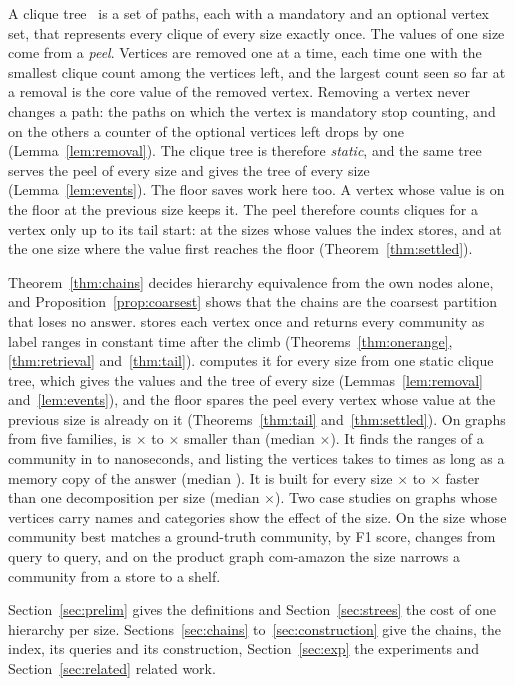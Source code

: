 %
A clique tree~\cite{Pivoter} is a set of paths, each with a mandatory and an optional vertex set, that represents every clique of every size exactly once.
%
The values of one size come from a \emph{peel}.
%
Vertices are removed one at a time, each time one with the smallest clique count among the vertices left, and the largest count seen so far at a removal is the core value of the removed vertex.
%
Removing a vertex never changes a path: the paths on which the vertex is mandatory stop counting, and on the others a counter of the optional vertices left drops by one (Lemma~\ref{lem:removal}).
%
The clique tree is therefore \emph{static}, and the same tree serves the peel of every size and gives the tree of every size (Lemma~\ref{lem:events}).
%
The floor saves work here too.
%
A vertex whose value is on the floor at the previous size keeps it.
%
The peel therefore counts cliques for a vertex only up to its tail start: at the sizes whose values the index stores, and at the one size where the value first reaches the floor (Theorem~\ref{thm:settled}).

Theorem~\ref{thm:chains} decides hierarchy equivalence from the own nodes alone, and Proposition~\ref{prop:coarsest} shows that the chains are the coarsest partition that loses no answer.
%
\chainidx stores each vertex once and returns every community as label ranges in constant time after the climb (Theorems~\ref{thm:onerange}, \ref{thm:retrieval} and~\ref{thm:tail}).
%
\build computes it for every size from one static clique tree, which gives the values and the tree of every size (Lemmas~\ref{lem:removal} and~\ref{lem:events}), and the floor spares the peel every vertex whose value at the previous size is already on it (Theorems~\ref{thm:tail} and~\ref{thm:settled}).
%
On \numgraphs{} graphs from five families, \chainidx is \ratiomin$\times$ to \ratiomax$\times$ smaller than \strees (median \ratiomedian$\times$).
%
It finds the ranges of a community in \locmin{} to \locmax{} nanoseconds, and listing the vertices takes \stmininv{} to \stmaxinv{} times as long as a memory copy of the answer (median \stmedianinv).
%
It is built for every size \priormin$\times$ to \priormax$\times$ faster than one decomposition per size (median \priormedian$\times$).
%
Two case studies on graphs whose vertices carry names and categories show the effect of the size.
%
On \dblp the size whose community best matches a ground-truth community, by F1 score, changes from query to query, and on the product graph \textsf{com-amazon} the size narrows a community from a store to a shelf.

Section~\ref{sec:prelim} gives the definitions and Section~\ref{sec:strees} the cost of one hierarchy per size.
%
Sections~\ref{sec:chains} to~\ref{sec:construction} give the chains, the index, its queries and its construction, Section~\ref{sec:exp} the experiments and Section~\ref{sec:related} related work.
